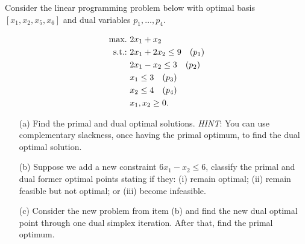 Consider the linear programming problem below with optimal basis $[x_1, x_2, x_5, x_6]$ and dual variables $p_1, \dots, p_4$.

\begin{align*}
	\mathop{\text{max.~}} & 2x_1 + x_2 \\
	\mathop{\text{s.t.:~}}   & 2x_1 + 2x_2 \le 9 \quad (p_1) \\
	      & 2x_1 - x_2 \le 3 \quad (p_2) \\
	      & x_1 \le 3 \quad (p_3) \\
	      & x_2 \le 4 \quad (p_4) \\
	      & x_1, x_2 \ge 0.
\end{align*}

\begin{itemize}
	\item[(a)] Find the primal and dual optimal solutions. \emph{HINT}: You can use complementary slackness, once having the primal optimum, to find the dual optimal solution.
	\item[(b)] Suppose we add a new constraint $6x_1 - x_2 \leq 6$, classify the primal and dual former optimal points stating if they: (i) remain optimal; (ii) remain feasible but not optimal; or (iii) become infeasible.
	\item[(c)] Consider the new problem from item (b) and find the new dual optimal point through one dual simplex iteration. After that, find the primal optimum.
\end{itemize}
